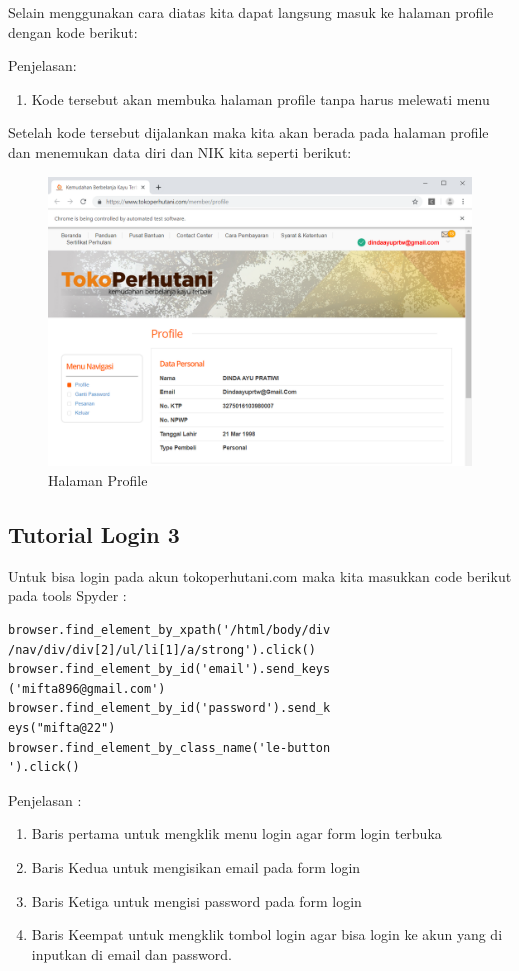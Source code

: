 Selain menggunakan cara diatas kita dapat langsung masuk ke halaman profile dengan kode berikut:



Penjelasan: 
\begin{enumerate}
	\item Kode tersebut akan membuka halaman profile tanpa harus melewati menu 
\end{enumerate}

Setelah kode tersebut dijalankan maka kita akan berada pada halaman profile dan menemukan data diri dan NIK kita seperti berikut:

\begin{figure}[h]
	\centering
	\includegraphics[scale=0.28]{figures/6profile}
	\caption{Halaman Profile}
\end{figure}


\newpage
\subsection{Tutorial Login 3}
Untuk bisa login pada akun tokoperhutani.com maka kita masukkan code berikut pada tools Spyder :
\begin{verbatim}
browser.find_element_by_xpath('/html/body/div
/nav/div/div[2]/ul/li[1]/a/strong').click()
browser.find_element_by_id('email').send_keys
('mifta896@gmail.com')
browser.find_element_by_id('password').send_k
eys("mifta@22")
browser.find_element_by_class_name('le-button
').click()
\end{verbatim}

Penjelasan :
\begin{enumerate}
	\item Baris pertama untuk mengklik menu login agar form login terbuka
	\item Baris Kedua untuk mengisikan email pada form login 
	\item Baris Ketiga untuk mengisi password pada form login
	\item Baris Keempat untuk mengklik tombol login agar bisa login ke akun yang di inputkan di email dan password.
\end{enumerate}

